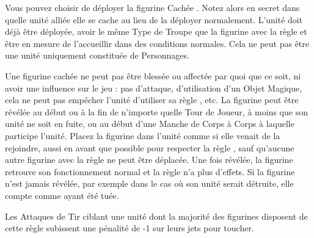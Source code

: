 


Vous pouvez choisir de déployer la figurine \og Cachée \fg{}. Notez alors en secret dans quelle unité alliée elle se cache au lieu de la déployer normalement. L'unité doit déjà être déployée, avoir le même Type de Troupe que la figurine avec la règle \hidden{} et être en mesure de l'accueillir dans des conditions normales. Cela ne peut pas être une unité uniquement constituée de Personnages.

Une figurine cachée ne peut pas être blessée ou affectée par quoi que ce soit, ni avoir une influence sur le jeu : pas d'attaque, d'utilisation d'un Objet Magique, cela ne peut pas empêcher l'unité d'utiliser sa règle \vanguard{}, etc. La figurine peut être révélée au début ou à la fin de n'importe quelle Tour de Joueur, à moins que son unité ne soit en fuite, ou au début d'une Manche de Corps à Corps à laquelle participe l'unité. Placez la figurine dans l'unité comme si elle venait de la rejoindre, aussi en avant que possible pour respecter la règle \frontrank{}, sauf qu'aucune autre figurine avec la règle \frontrank{} ne peut être déplacée. Une fois révélée, la figurine retrouve son fonctionnement normal et la règle n'a plus d'effets. Si la figurine n'est jamais révélée, par exemple dans le cas où son unité serait détruite, elle compte comme ayant été tuée.


Les Attaques de Tir ciblant une unité dont la majorité des figurines disposent de cette règle subissent une pénalité de -1 sur leurs jets pour toucher.



